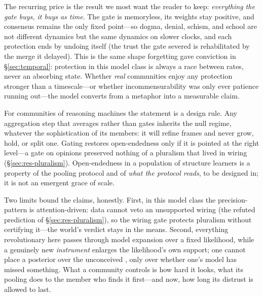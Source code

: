 \documentclass[runningheads]{llncs}
\begin{document}
The recurring price is the result we most want the reader to keep: \emph{everything the gate
buys, it buys as time}. The gate is memoryless, its weights stay positive, and consensus remains
the only fixed point---so dogma, denial, schism, and school are not different dynamics but the
same dynamics on slower clocks, and each protection ends by undoing itself (the trust the gate
severed is rehabilitated by the merge it delayed). This is the same shape forgetting gave
conviction in \S\ref{sec:temporal}: protection in this model class is always a race between
rates, never an absorbing state. Whether \emph{real} communities enjoy any protection stronger
than a timescale---or whether incommensurability was only ever patience running out---the model
converts from a metaphor into a measurable claim.

For communities of reasoning machines the statement is a design rule. Any aggregation step that
averages rather than gates inherits the null regime, whatever the sophistication of its members:
it will refine frames and never grow, hold, or split one. Gating restores open-endedness only if
it is pointed at the right level---a gate on opinions preserved nothing of a pluralism that
lived in wiring (\S\ref{sec:res-pluralism}). Open-endedness in a population of structure
learners is a property of the pooling protocol and of \emph{what the protocol reads}, to be
designed in; it is not an emergent grace of scale.

Two limits bound the claims, honestly. First, in this model class the precision-pattern is
attention-driven: data cannot veto an unsupported wiring (the refuted prediction of
\S\ref{sec:res-pluralism}), so the wiring gate protects pluralism without certifying it---the
world's verdict stays in the means. Second, everything revolutionary here passes through model
expansion over a fixed likelihood, while a genuinely new \emph{instrument} enlarges the
likelihood's own support; one cannot place a posterior over the unconceived
\citep{stanford2006}, only over whether one's model has missed something. What a community
controls is how hard it looks, what its pooling does to the member who finds it first---and now,
how long its distrust is allowed to last.
\end{document}
